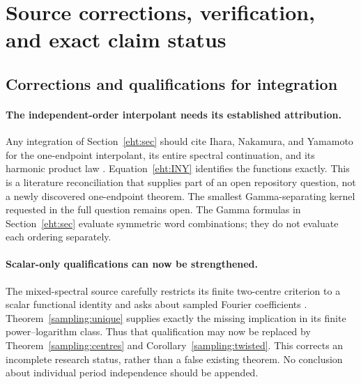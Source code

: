 \section{Source corrections, verification, and exact claim status}
\label{audit:section}

\subsection{Corrections and qualifications for integration}

\paragraph{The independent-order interpolant needs its established attribution.}
Any integration of Section~\ref{eht:sec} should cite Ihara, Nakamura,
and Yamamoto for the one-endpoint interpolant, its entire spectral
continuation, and its harmonic product law \cite{eht:INY}.
Equation~\eqref{eht:INY} identifies the functions exactly. This is a
literature reconciliation that supplies part of an open repository
question, not a newly discovered one-endpoint theorem. The smallest
Gamma-separating kernel requested in the full question remains open.
The Gamma formulas in Section~\ref{eht:sec} evaluate symmetric word
combinations; they do not evaluate each ordering separately.

\paragraph{Scalar-only qualifications can now be strengthened.}
The mixed-spectral source carefully restricts its finite two-centre
criterion to a scalar functional identity and asks about sampled
Fourier coefficients \cite{RepoMixed}. Theorem~\ref{sampling:unique}
supplies exactly the missing implication in its finite power--logarithm
class. Thus that qualification may now be replaced by
Theorem~\ref{sampling:centres} and Corollary~\ref{sampling:twisted}.
This corrects an incomplete research status, rather than a false
existing theorem. No conclusion about individual period independence
should be appended.

